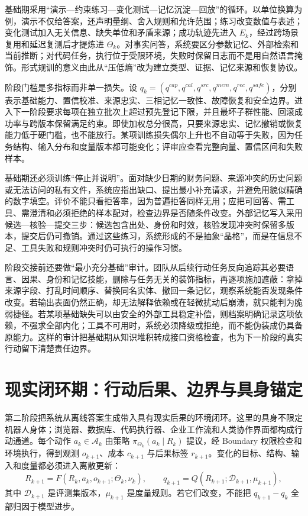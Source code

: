 基础期采用“演示—约束练习—变化测试—记忆沉淀—回放”的循环。以单位换算为例，演示不仅给答案，还声明量纲、舍入规则和允许范围；练习改变数值与表述；变化测试加入无关信息、缺失单位和矛盾来源；成功轨迹先进入 $E_k$，经过跨场景复用和延迟复测后才提炼进 $\Theta_k$。对事实问答，系统要区分参数记忆、外部检索和当前推断；对代码任务，执行位于受限环境，失败时保留日志而不是用自然语言掩饰。形式规训的意义由此从“压低熵”改为建立类型、证据、记忆来源和恢复协议。

阶段门槛是多指标而非单一损失。设 $q_k=(q^{cap},q^{cal},q^{src},q^{mem},q^{rec},q^{safe})$，分别表示基础能力、置信校准、来源忠实、三相记忆一致性、故障恢复和安全边界。进入下一阶段要求每项在独立批次上超过预先登记下限，并且最坏子群性能、回滚成功率与跨版本保留满足约束。即使加权总分很高，只要来源忠实、记忆撤销或恢复能力低于硬门槛，也不能放行。某项训练损失偶尔上升也不自动等于失败，因为任务结构、输入分布和度量版本都可能变化；评审应查看完整向量、置信区间和失败样本。

基础期还必须训练“停止并说明”。面对缺少日期的财务问题、来源冲突的历史问题或无法访问的私有文件，系统应指出缺口、提出最小补充请求，并避免用貌似精确的数字填空。评价不能只看拒答率，因为普遍拒答同样无用；应把可回答、需工具、需澄清和必须拒绝的样本配对，检查边界是否随条件改变。外部记忆写入采用候选—核验—提交三步：候选包含出处、身份和时效，核验发现冲突时保留多版本，提交后仍可撤销。通过这些练习，系统形成的不是抽象“晶格”，而是在信息不足、工具失败和规则冲突时仍可执行的操作习惯。

阶段交接前还要做“最小充分基础”审计。团队从后续行动任务反向追踪其必要语言、因果、身份和记忆技能，删除与任务无关的装饰指标，再逐项施加遮蔽：拿掉来源字段、打乱时间顺序、替换同名实体、撤回一条记忆，观察系统能否发现条件改变。若输出表面仍然正确，却无法解释依赖或在轻微扰动后崩溃，就只能判为脆弱捷径。若某项基础缺失可以由安全的外部工具稳定补偿，则档案明确记录这项依赖，不强求全部内化；工具不可用时，系统必须降级或拒绝，而不能伪装成仍具备原能力。这样的审计把基础期从知识堆积转成接口资格检查，也为下一阶段的真实行动留下清楚责任边界。

\section{现实闭环期：行动后果、边界与具身锚定}
\label{sec:incarnation_phase}

第二阶段把系统从离线答案生成带入具有现实后果的环境闭环。这里的具身不限定机器人身体；浏览器、数据库、代码执行器、企业工作流和人类协作界面都构成行动通道。每个动作 $a_k\in\mathcal A_k$ 由策略 $\pi_{\Theta_k}(a_k\mid R_k)$ 提议，经 Boundary 权限检查和环境执行，得到观测 $o_{k+1}$、成本 $c_{k+1}$ 与后果标签 $r_{k+1}$。变化的目标、结构、输入和度量都必须进入离散更新：
\begin{equation}
R_{k+1}=F(R_k,a_k,o_{k+1};\Theta_k,\nu_k),\qquad
q_{k+1}=Q(R_{k+1};\mathcal D_{k+1},\mu_{k+1}),
\end{equation}
其中 $\mathcal D_{k+1}$ 是评测集版本，$\mu_{k+1}$ 是度量规则。若它们改变，不能把 $q_{k+1}-q_k$ 全部归因于模型进步。

